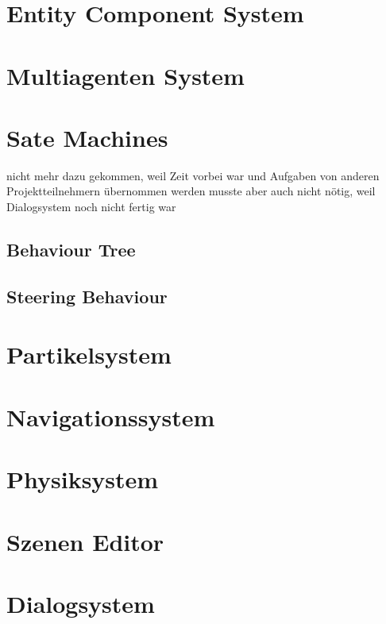 
\section{Entity Component System}

\section{Multiagenten System}

\section{Sate Machines}

nicht mehr dazu gekommen, weil Zeit vorbei war und Aufgaben von anderen Projektteilnehmern übernommen werden musste
aber auch nicht nötig, weil Dialogsystem noch nicht fertig war

\subsection{Behaviour Tree}

\subsection{Steering Behaviour}

\section{Partikelsystem}

\section{Navigationssystem}

\section{Physiksystem}

\section{Szenen Editor}

\section{Dialogsystem}